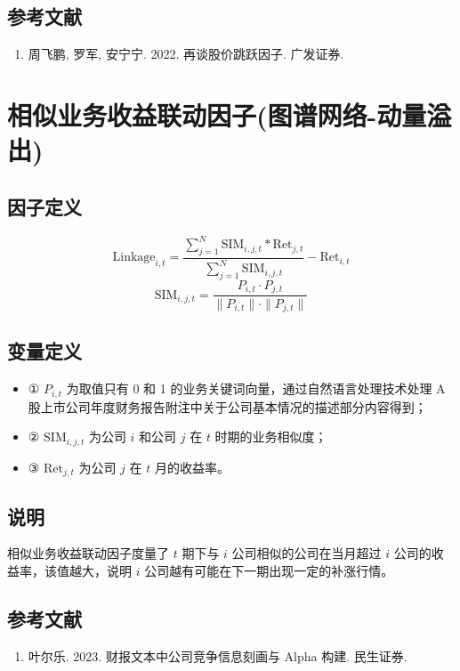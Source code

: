 \documentclass{article}
\begin{document}
\subsection{参考文献}
\begin{enumerate}
    \item 周飞鹏, 罗军, 安宁宁. 2022. 再谈股价跳跃因子. 广发证券.
\end{enumerate}

\section{相似业务收益联动因子(图谱网络-动量溢出)}

\subsection{因子定义}
\begin{equation}
    \mathrm{Linkage}_{i,t} = \frac{\sum_{j=1}^N \mathrm{SIM}_{i,j,t} * \mathrm{Ret}_{j,t}}{\sum_{j=1}^N \mathrm{SIM}_{i,j,t}} - \mathrm{Ret}_{i,t}
\end{equation}
\begin{equation}
    \mathrm{SIM}_{i,j,t} = \frac{P_{i,t} \cdot P_{j,t}}{\|P_{i,t}\| \cdot \|P_{j,t}\|}
\end{equation}

\subsection{变量定义}
\begin{itemize}
    \item ① \( P_{i,t} \) 为取值只有 0 和 1 的业务关键词向量，通过自然语言处理技术处理 A 股上市公司年度财务报告附注中关于公司基本情况的描述部分内容得到；
    \item ② \( \mathrm{SIM}_{i,j,t} \) 为公司 \( i \) 和公司 \( j \) 在 \( t \) 时期的业务相似度；
    \item ③ \( \mathrm{Ret}_{j,t} \) 为公司 \( j \) 在 \( t \) 月的收益率。
\end{itemize}

\subsection{说明}
相似业务收益联动因子度量了 \( t \) 期下与 \( i \) 公司相似的公司在当月超过 \( i \) 公司的收益率，该值越大，说明 \( i \) 公司越有可能在下一期出现一定的补涨行情。

\subsection{参考文献}
\begin{enumerate}
    \item 叶尔乐. 2023. 财报文本中公司竞争信息刻画与 Alpha 构建. 民生证券.
\end{enumerate}
\end{document}
